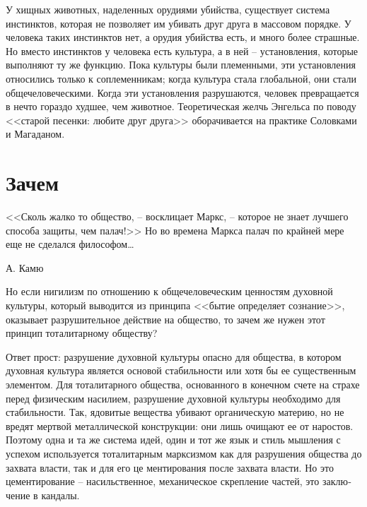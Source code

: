 \documentclass{book}
\begin{document}
У хищных животных, наделенных орудиями убийства, существует система инстинктов, которая не позволяет им убивать друг друга в 
массовом порядке. У человека таких инстинктов нет, а орудия убийства есть, и много более страшные. Но вместо инстинктов у 
человека есть культура, а в ней -- установления, которые выполняют ту же функцию. Пока культуры были племенными, эти 
установления относились только к соплеменникам; когда культура стала глобальной, они стали общечеловеческими. Когда эти 
установления разрушаются, человек превращается в нечто гораздо худшее, чем животное. Теоретическая желчь Энгельса по поводу 
<<старой песенки: любите друг друга>> оборачивается на практике Соловками и Магаданом.

\section{Зачем}

\epigraph{<<Сколь жалко то общество, -- восклицает Маркс, -- которое не знает лучшего способа защиты, чем палач!>> Но во времена 
Маркса палач по крайней мере еще не сделался философом\ldots}{А. Камю%
}

Но если нигилизм по отношению к общечеловеческим ценностям духовной культуры, который выводится из принципа <<бытие определяет 
сознание>>, оказывает разрушительное действие на общество, то зачем же нужен этот принцип тоталитарному обществу?

Ответ прост: разрушение духовной культуры опасно для общества, в котором духовная культура является основой стабильности или 
хотя бы ее существенным элементом. Для тоталитарного общества, основанного в конечном счете на страхе перед физическим насилием, 
разрушение духовной культуры необходимо для стабильности. Так, ядовитые вещества убивают органическую материю, но не вредят 
мертвой металлической конструкции: они лишь очищают ее от наростов. Поэтому одна и та же система идей, один и тот же язык и 
стиль мышления с успехом используется тоталитарным марксизмом как для разрушения общества до захвата власти, так и для его це­
ментирования после захвата власти. Но это цементирование -- насильственное, механическое скрепление частей, это заклю­чение в 
кандалы.
\end{document}
